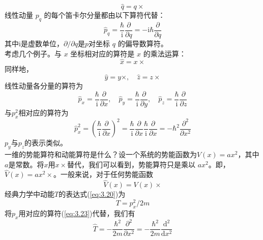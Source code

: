 	\begin{equation*}
		\hat{q} = q \times
	\end{equation*}
	线性动量 $p_q$ 的每个笛卡尔分量都由以下算符代替：
	\begin{equation*}
		\hat{p}_q = \frac{\hbar}{\mathrm{i}}\frac{\partial}{\partial q} = -\mathrm{i}\hbar\frac{\partial}{\partial q}
	\end{equation*}	
	其中$\mathrm{i}$是虚数单位，$\partial / \partial q$是$p$对坐标 $q$ 的偏导数算符。\\
	\indent 考虑几个例子。与 $x$ 坐标相对应的算符是 $x$ 的乘法运算：
	\begin{equation}
		\boxed{
			\hat{x} = x \times
		}
		\label{eq:3.21}
	\end{equation}
	同样地，
	\begin{equation}
		\boxed{
			\hat{y} = y \times, \quad \hat{z} = z \times
		}
		\label{eq:3.22}
	\end{equation}
	线性动量各分量的算符为
	\begin{equation}
		\boxed{
			\hat{p}_x = \frac{\hbar}{\mathrm{i}}\frac{\partial}{\partial x}, \quad \hat{p}_y = \frac{\hbar}{\mathrm{i}}\frac{\partial}{\partial y}, \quad \hat{p}_z = \frac{\hbar}{\mathrm{i}}\frac{\partial}{\partial z}
		}
		\label{eq:3.23}
	\end{equation}
	与$p_x^2$相对应的算符为
	\begin{equation}
		\hat{p}_x^2 = \left(\frac{\hbar}{\mathrm{i}} \frac{\partial}{\partial x}\right)^2 = \frac{\hbar}{\mathrm{i}} \frac{\partial}{\partial x}\frac{\hbar}{\mathrm{i}} \frac{\partial}{\partial x} = -\hbar^2 \frac{\partial^2}{\partial x^2}
		\label{eq:3.24}
	\end{equation}
	$p_y$与$p_z$的表示类似。\\
	\indent 一维的势能算符和动能算符是什么？设一个系统的势能函数为$V\left(x\right) = ax^2$，其中$a$是常数。将$x$用$x \times$替代，我们可以看到，势能算符只是乘以 $ax^2$。即，$\hat{V}\left(x\right) = ax^2 \times$。一般来说，对于任何势能函数
	\begin{equation}
		\boxed{
			\hat{V}\left(x\right) = V\left(x\right) \times 
		}
		\label{eq:3.25 definition of potential energy operator}
	\end{equation}
	经典力学中动能$T$的表达式(\ref{eq:3.20})为
	\begin{equation}
		\boxed{
			T = p_x^2 / 2m
		}
		\label{eq:3.26}
	\end{equation}
	将$p_x$用对应的算符(\ref{eq:3.23})代替，我们有
	\begin{equation}
		\hat{T} = -\frac{\hbar^2}{2m}\frac{\partial^2}{\partial x^2} = -\frac{\hbar^2}{2m}\frac{\mathrm{d}^2}{\mathrm{d}x^2}
		\label{eq:3.27}
	\end{equation}
